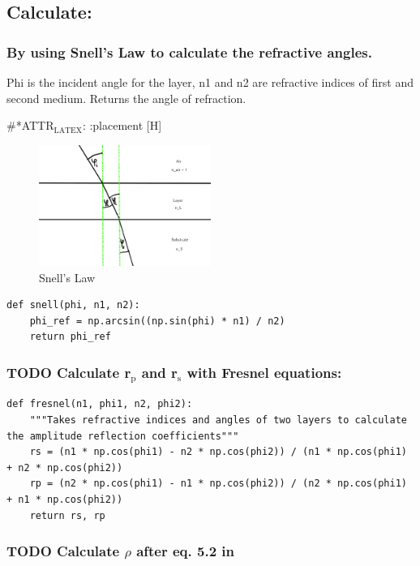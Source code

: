 \documentclass[11pt]{article}
\begin{document}
\subsection{Calculate:}
\label{sec:orgba19354}
\subsubsection{By using Snell's Law to calculate the refractive angles.}
\label{sec:orgb4e2d87}
Phi is the incident angle for the layer, n1 and n2 are refractive indices of first and second medium. Returns the angle of refraction.

\#*ATTR\(_{\text{LATEX}}\): :placement [H]
\begin{figure}[htbp]
\centering
\includegraphics[width=0.5\textwidth]{./snell.jpg}
\caption{\label{fig:orgddc71e3}
Snell's Law}
\end{figure}
\begin{verbatim}
def snell(phi, n1, n2):
    phi_ref = np.arcsin((np.sin(phi) * n1) / n2)
    return phi_ref
\end{verbatim}


\subsubsection{{\bfseries\sffamily TODO} Calculate r\(_{\text{p}}\) and r\(_{\text{s}}\) with Fresnel equations:}
\label{sec:orga39ab1e}
\begin{verbatim}
def fresnel(n1, phi1, n2, phi2):
    """Takes refractive indices and angles of two layers to calculate the amplitude reflection coefficients"""
    rs = (n1 * np.cos(phi1) - n2 * np.cos(phi2)) / (n1 * np.cos(phi1) + n2 * np.cos(phi2))
    rp = (n2 * np.cos(phi1) - n1 * np.cos(phi2)) / (n2 * np.cos(phi1) + n1 * np.cos(phi2))
    return rs, rp
\end{verbatim}

\subsubsection{{\bfseries\sffamily TODO} Calculate \(\rho\) after eq. 5.2 in }
\label{sec:orgc232e8f}
\end{document}
